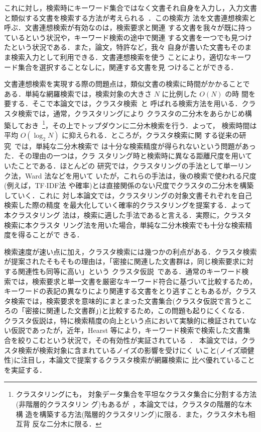 これに対し，検索時にキーワード集合ではなく文書それ自身を入力し，入力文書
と類似する文書を検索する方法が考えられる~\cite{wilbur:94:a}．この検索方
法を{\gt 文書連想検索}と呼ぶ．文書連想検索が有効なのは，検索要求と関連
する文書を我々が既に持っているという状況や，キーワード検索の途中で関連
する文書を一つでも見つけたという状況である．また，論文，特許など，我々
自身が書いた文書もそのまま検索入力として利用できる．文書連想検索を使う
ことにより，適切なキーワード集合を選択することなしに，関連する文書を見
つけることができる．

文書連想検索を実現する際の問題点は，類似文書の検索に時間がかかることで
ある．単純な網羅検索では，検索対象の大きさ $N$ に比例した $O(N)$ の時
間を要する．そこで本論文では，{\gt クラスタ検索}~\cite{salton:83:a}と
呼ばれる検索方法を用いる．クラスタ検索では，通常，クラスタリングにより
クラスタの二分木をあらかじめ構築しておき~\footnote{クラスタリングにも，
対象データ集合を平坦なクラスタ集合に分割する方法(非階層的クラスタリン
グ)もあるが~\cite{anderberg:73:a}，本論文では，クラスタの階層的な木構
造を構築する方法(階層的クラスタリング)に限る．また，クラスタ木も相互背
反な二分木に限る．}，その上でトップダウンに二分木検索を行う．よって，
検索時間は平均 $O(\log_2 N)$ に抑えられる．ところが，クラスタ検索に関
する従来の研究~\cite{croft:80:a,willett:88:a}では，単純な二分木検索で
は十分な検索精度が得られないという問題があった．その理由の一つは，クラ
スタリング時と検索時に異なる距離尺度を用いていたことである．ほとんどの
研究では，クラスタリングの手法として単一リンク法，Ward 法などを用いて
いたが，これらの手法は，後の検索で使われる尺度(例えば，TF$\cdot$IDF法
や確率)とは直接関係のない尺度でクラスタの二分木を構築していく．これに
対し本論文では，クラスタリングの対象文書それぞれを自己検索した際の精度
を最大化していく確率的クラスタリングを提案する．よって本クラスタリング
法は，検索に適した手法であると言える．実際に，クラスタ検索に本クラスタ
リング法を用いた場合，単純な二分木検索でも十分な検索精度を得ることがで
きる．

検索速度が速い点に加え，クラスタ検索には幾つかの利点がある．クラスタ検索
が提案されたそもそもの理由は，「密接に関連した文書群は，同じ検索要求に対
する関連性も同等に高い」という
{\gt クラスタ仮説}~\cite{van-rijsbergen:74:a}である．通常のキーワード検
索では，検索要求と単一文書を厳密なキーワード符合に基づいて比較するため，
キーワードの表記の異なりにより関連する文書をとり逃すこともあるが，クラス
タ検索では，検索要求を意味的にまとまった文書集合(クラスタ仮説で言うとこ
ろの「密接に関連した文書群」)と比較するため，この問題も起りにくくなる．
クラスタ仮説は，特に検索精度の向上という点において実験的に検証されていな
い仮説であったが，近年，Hearst 等により，キーワード検索で検索した文書集
合を絞りこむという状況で，その有効性が実証されている~\cite{hearst:96:a}．
本論文では，クラスタ検索が検索対象に含まれているノイズの影響を受けにく
いこと(ノイズ頑健性)に注目し，本論文で提案するクラスタ検索が網羅検索に
比べ優れていることを実証する．

